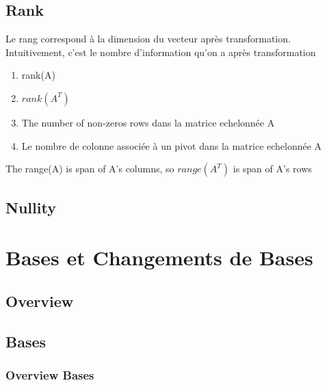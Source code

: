 \documentclass{article}
\begin{document}
\subsection{Rank}%
\label{sub:Rank}

Le rang correspond à la dimension du vecteur après transformation.
Intuitivement, c'est le nombre d'information qu'on a après transformation

\begin{theorem}
    \begin{enumerate}
	\item rank(A)
	\item $rank(A^T)$
	\item The number of non-zeros rows dans la matrice echelonnée A
	\item Le nombre de colonne associée à un pivot dans la matrice
	    echelonnée A
    \end{enumerate}
\end{theorem}

\begin{remark}
    The range(A) is span of A's columns, so $range(A^T)$ is span of A's
    rows
\end{remark}



\subsection{Nullity}%
\label{sub:Nullity}




\section{Bases et Changements de Bases}%
\label{sec:Bases et Changements de Bases}

\subsection{Overview}%
\label{sub:Overview}

\subsection{Bases}%
\label{sub:Bases}

\subsubsection{Overview Bases}%
\label{sub:Overview Bases}
\end{document}
